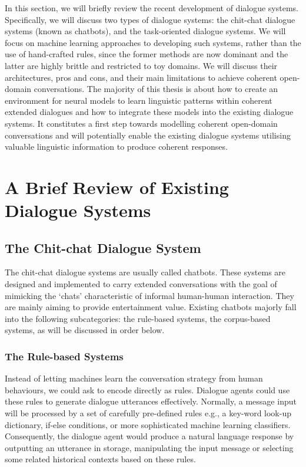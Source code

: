 \documentclass[bsc,frontabs,twoside,singlespacing,parskip,deptreport]{infthesis}     %
\begin{document}
In this section, we will briefly review the recent development of dialogue systems. Specifically, we will discuss two types of dialogue systems: the chit-chat dialogue systems (known as chatbots), and the task-oriented dialogue systems. We will focus on machine learning approaches to developing such systems, rather than the use of hand-crafted rules, since the former methods are now dominant and the latter are highly brittle and restricted to toy domains. We will discuss their architectures, pros and cons, and their main limitations to achieve coherent open-domain conversations. The majority of this thesis is about how to create an environment for neural models to learn linguistic patterns within coherent extended dialogues and how to integrate these models into the existing dialogue systems. It constitutes a first step towards modelling coherent open-domain conversations and will potentially enable the existing dialogue systems utilising valuable linguistic information to produce coherent responses.

\section {A Brief Review of Existing Dialogue Systems}

\subsection{The Chit-chat Dialogue System}

The chit-chat dialogue systems are usually called chatbots. These systems are designed and implemented to carry extended conversations with the goal of mimicking the ‘chats’ characteristic of informal human-human interaction\cite{jurafsky2019speech}. They are mainly aiming to provide entertainment value. Existing chatbots majorly fall into the following subcategories: the rule-based systems, the corpus-based systems, as will be discussed in order below.

\subsubsection*{The Rule-based Systems}

Instead of letting machines learn the conversation strategy from human behaviours, we could ask to encode directly as rules. Dialogue agents could use these rules to generate dialogue utterances effectively. Normally, a message input will be processed by a set of carefully pre-defined rules e.g., a key-word look-up dictionary, if-else conditions, or more sophisticated machine learning classifiers\cite{jiweilithesis}. Consequently, the dialogue agent would produce a natural language response by outputting an utterance in storage, manipulating the input message or selecting some related historical contexts based on these rules.
\end{document}
